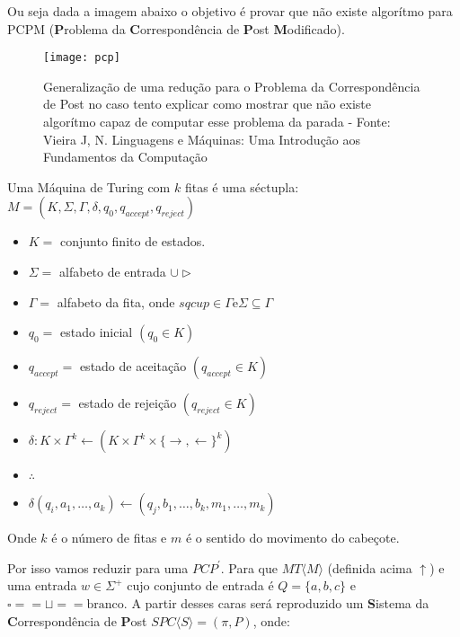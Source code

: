 \documentclass[12pt, a4paper]{article}
\begin{document}
\qquad Ou seja dada a imagem abaixo o objetivo é provar que não existe algorítmo para PCPM (\textbf{P}roblema da \textbf{C}orrespondência de \textbf{P}ost \textbf{M}odificado).

\begin{center}
\begin{figure}[ht]
\texttt{[image: pcp]}
\caption{Generalização de uma redução para o Problema da Correspondência de Post no caso tento explicar como mostrar que não existe algorítmo capaz de computar esse problema da parada - Fonte: Vieira J, N. Linguagens e Máquinas: Uma Introdução aos Fundamentos da Computação}
\end{figure}
\end{center}

\pagebreak


Uma Máquina de Turing com $k$ fitas é uma séctupla: $M = ( K, \Sigma , \Gamma , \delta, q_{0}, q_{accept}, q_{reject})$

\begin{itemize}
\item $K =$ conjunto finito de estados.
\item $\Sigma =$ alfabeto de entrada $\cup{\triangleright}$
\item $\Gamma = $ alfabeto da fita, onde $sqcup  \in \Gamma \text{e} \Sigma \subseteq \Gamma$
\item $q_{0} = $ estado inicial $(q_{0} \in K)$
\item $q_{accept} = $ estado de aceitação $(q_{accept} \in K)$
\item$q_{reject} = $ estado de rejeição $(q_{reject} \in K)$
\item$\delta : K \times \Gamma^{k} \leftarrow (K \times \Gamma^{k} \times {\lbrace \rightarrow, \leftarrow \rbrace}^{k})$
\item $\therefore$
\item $\delta(q_{i}, a_{1}, \ldots , a_{k}) \leftarrow (q_{j}, b_{1}, \ldots, b_{k}, m_{1}, \ldots, m_{k})$
\end{itemize}

\qquad Onde $k$ é o número de fitas e $m$ é o sentido do movimento do cabeçote.

\qquad Por isso vamos reduzir para uma $PCP^{'}$. Para que $MT \langle M \rangle$ (definida acima $\uparrow$) e uma entrada $w \in \Sigma^{+}$ cujo conjunto de entrada é $Q = \lbrace a, b, c \rbrace $ e $\square == \sqcup ==  \text{branco}$. A partir desses caras será reproduzido um \textbf{S}istema da \textbf{C}orrespondência de \textbf{P}ost $SPC \langle S \rangle = (\pi, P)$, onde:
\end{document}
